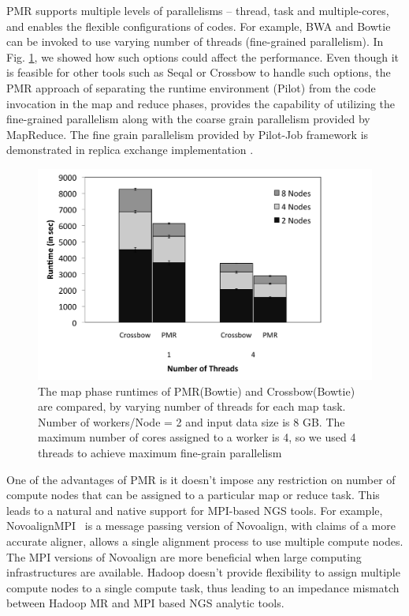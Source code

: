 \documentclass[12pt]{report}
\begin{document}
PMR supports multiple levels of parallelisms -- thread, task and
multiple-cores, and enables the flexible configurations of codes. For
example, BWA and Bowtie can be invoked to use varying number of
threads (fine-grained parallelism).  In Fig. \ref{fig:multi-parallel},
we showed how such options could affect the performance.  Even
though it is feasible for other tools such as Seqal or Crossbow to
handle such options, the PMR approach of separating the runtime
environment (Pilot) from the code invocation in the map and reduce
phases, provides the capability of utilizing the fine-grained
parallelism along with the coarse grain parallelism provided by
MapReduce. The fine grain parallelism provided by Pilot-Job framework is 
demonstrated in replica exchange implementation \cite{repex_ptrsa}.


\begin{figure} 
 \centering
\includegraphics[scale=0.42]{figures/fig6_bw2.pdf}
\caption{\small The map phase runtimes of PMR(Bowtie) and Crossbow(Bowtie) are compared, by varying number of threads for each map task.  Number of workers/Node = 2 and input data size is 8 GB. The maximum number of cores assigned to a worker is 4, so we used 4 threads to achieve maximum fine-grain parallelism}
  \label{fig:multi-parallel} 
\end{figure}


One of the advantages of PMR is it doesn't impose any restriction on
number of compute nodes that can be assigned to a particular map or
reduce task. This leads to a natural and native support for MPI-based
NGS tools. For example,  NovoalignMPI~\cite{novo-align} is a message
passing version of Novoalign, with claims of a more accurate aligner,
allows a single alignment process to use multiple compute nodes. The
MPI versions of Novoalign are more beneficial when large computing
infrastructures are available.  Hadoop doesn't provide flexibility to
assign multiple compute nodes to a single compute task, thus leading
to an impedance mismatch between Hadoop MR and MPI based NGS analytic
tools.
\end{document}
